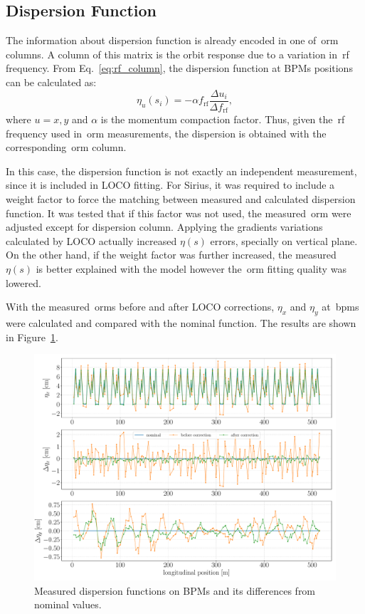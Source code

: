 \subsection{Dispersion Function}
The information about dispersion function is already encoded in one of~\gls{orm} columns. A column of this matrix is the orbit response due to a variation in~\gls{rf} frequency. From Eq.~\eqref{eq:rf_column}, the dispersion function at BPMs positions can be calculated as:
\begin{equation}
\eta_u(s_i) = -\alpha f_{\mathrm{rf}}\dfrac{\Delta u_i}{ \Delta f_{\mathrm{rf}}},
\end{equation}
where $u=x, y$ and $\alpha$ is the momentum compaction factor. Thus, given the~\gls{rf} frequency used in~\gls{orm} measurements, the dispersion is obtained with the corresponding~\gls{orm} column.

In this case, the dispersion function is not exactly an independent measurement, since it is included in LOCO fitting. For Sirius, it was required to include a weight factor to force the matching between measured and calculated dispersion function. It was tested that if this factor was not used, the measured~\gls{orm} were adjusted except for dispersion column. Applying the gradients variations calculated by LOCO actually increased $\eta(s)$ errors, specially on vertical plane. On the other hand, if the weight factor was further increased, the measured $\eta(s)$ is better explained with the model however the~\gls{orm} fitting quality was lowered.

With the measured~\gls{orm}s before and after LOCO corrections, $\eta_x$ and $\eta_y$ at~\glspl{bpm} were calculated and compared with the nominal function. The results are shown in Figure~\ref{fig:disp_error}. 
\begin{figure}
\centering
\includegraphics[width=1.0\textwidth]{figures/dispersion_after_before_loco_legend.pdf}
\caption{Measured dispersion functions on BPMs and its differences from nominal values.}
\label{fig:disp_error}
\end{figure}

